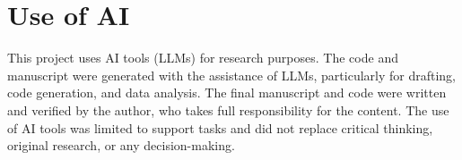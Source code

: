 \documentclass{article}
\begin{document}
\section{Use of AI}

This project uses AI tools (LLMs) for research purposes. The code and manuscript were generated with the assistance of LLMs, particularly for drafting, code generation, and data analysis. The final manuscript and code were written and verified by the author, who takes full responsibility for the content. The use of AI tools was limited to support tasks and did not replace critical thinking, original research, or any decision-making.

\newpage

\printbibliography
\end{document}
